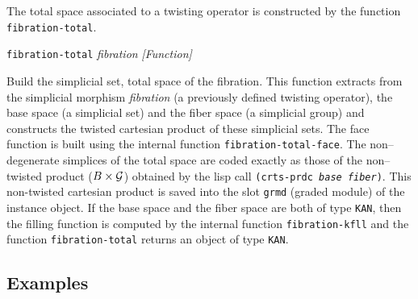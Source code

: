 The total space associated to a twisting operator is constructed
by the function {\tt fibration-total}.
\vskip 0.30cm
{\parindent=0mm
{\leftskip=5mm
{\tt fibration-total} {\em fibration} \hfill {\em [Function]} \par}
{\leftskip=15mm
Build the simplicial set, total space of the fibration. This function
extracts from the simplicial morphism {\em fibration} (a previously defined twisting operator),
the base space (a simplicial set)
and the fiber space (a simplicial group) and constructs
the twisted cartesian product of these simplicial sets.
The face function is built using the internal function {\tt fibration-total-face}.
The non--degenerate simplices of the total space are coded exactly as those of
the non--twisted product ($ B \times {\cal G}$) obtained by the lisp call
{\tt (crts-prdc {\em base} {\em fiber})}. This non-twisted cartesian product is saved
into the slot {\tt grmd} (graded module) of the instance object.
If the base space  and the fiber space  are both of type {\tt KAN}, then the filling function is computed
by the internal function {\tt fibration-kfll} and  the function {\tt fibration-total}
returns  an object of type {\tt KAN}.  \par}
}

\subsection* {Examples}

